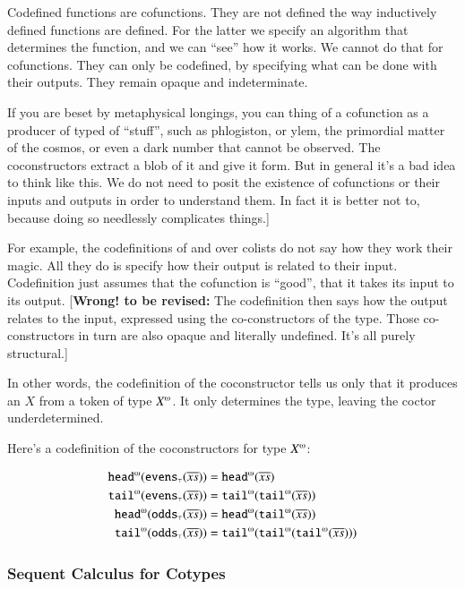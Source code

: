 Codefined functions are cofunctions. They are not defined the way
inductively defined functions are defined. For the latter we specify
an algorithm that determines the function, and we can ``see'' how it
works. We cannot do that for cofunctions. They can only be codefined,
by specifying what can be done with their outputs. They remain opaque
and indeterminate.

If you are beset by metaphysical longings, you can thing of a
cofunction as a producer of typed of ``stuff'', such as phlogiston, or
ylem, the primordial matter of the cosmos, or even a dark number that
cannot be observed. The coconstructors extract a blob of it and give
it form. But in general it's a bad idea to think like this. We do not
need to posit the existence of cofunctions or their inputs and outputs
in order to understand them. In fact it is better not to, because doing so needlessly complicates things.]

For example, the codefinitions of  and  over
colists do not say how they work their magic. All they do is specify
how their output is related to their input. Codefinition just assumes
that the cofunction is ``good'', that it takes its input to its
output. [\textbf{Wrong! to be revised:}
The codefinition then says how the output relates to the
input, expressed using the co-constructors of the type. Those
co-constructors in turn are also opaque and literally undefined. It's
all purely structural.]

In other words, the codefinition of the coconstructor \cohead{} tells
us only that it produces an \(X\) from a token of type \(\colist{X}\).
It only determines the type, leaving the coctor underdetermined.

Here's a codefinition of the coconstructors for type \(\colist{X}\):

\begin{align}
  \cohead(\codefn{evens}(\coseq{x})) & = \cohead(\coseq{x}) \\
  \cotail(\codefn{evens}(\coseq{x})) & = \cotail(\cotail(\coseq{x})) \\
  \cohead(\codefn{odds}(\coseq{x})) & = \cohead(\cotail(\coseq{x})) \\
  \cotail(\codefn{odds}(\coseq{x})) & = \cotail(\cotail(\cotail(\coseq{x})))
\end{align}

\subsubsection{Sequent Calculus for Cotypes}

